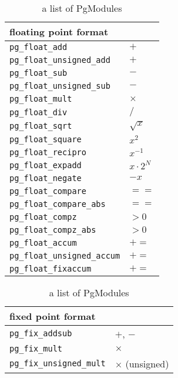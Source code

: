 \documentclass{llncs}
\begin{document}
\begin{table}
  \begin{center}
    \caption{a list of PgModules}

    \begin{minipage}{.45\linewidth}
      \begin{tabular}{ll}
	\hline
	floating point format & \\
	\hline
	    {\tt pg\_float\_add}           &  $+$\\
	    {\tt pg\_float\_unsigned\_add} &  $+$\\
	    {\tt pg\_float\_sub}           &  $-$\\
	    {\tt pg\_float\_unsigned\_sub} &  $-$\\
	    {\tt pg\_float\_mult}          &  $\times$\\
	    {\tt pg\_float\_div}           &  $/$ \\
	    {\tt pg\_float\_sqrt}          &  $\sqrt{x}$ \\
	    {\tt pg\_float\_square}        &  $x^2$\\
	    {\tt pg\_float\_recipro}       &  $x^{-1}$\\
	    {\tt pg\_float\_expadd}        &  $x \cdot 2^{N}$\\
	    {\tt pg\_float\_negate}        &  $-x$\\
	    {\tt pg\_float\_compare}       &  $==$\\
	    {\tt pg\_float\_compare\_abs}  &  $==$\\
	    {\tt pg\_float\_compz}         &  $>0$\\
	    {\tt pg\_float\_compz\_abs}    &  $>0$\\
	    {\tt pg\_float\_accum}         &  $+=$\\
	    {\tt pg\_float\_unsigned\_accum}& $+=$\\
	    {\tt pg\_float\_fixaccum}      &  $+=$\\
	    \hline
      \end{tabular}
    \end{minipage}
    \hspace{2.3pc}
    \begin{minipage}{.45\linewidth}
      \begin{tabular}{ll}
	\hline
	fixed point format & \\
	\hline
	{\tt pg\_fix\_addsub}          &  $+$, $-$\\
	{\tt pg\_fix\_mult}            &  $\times$\\
	{\tt pg\_fix\_unsigned\_mult}  &  $\times$ (unsigned)\\

\end{tabular}
\end{minipage}
\end{center}
\end{table}
\end{document}

